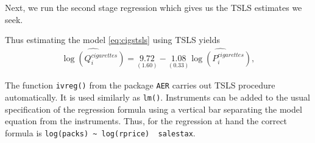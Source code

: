 \documentclass[
  14pt,
]{memoir}
\newenvironment{Shaded}{\begin{snugshade}}{\end{snugshade}}
\newcommand{\AttributeTok}[1]{\textcolor[rgb]{0.77,0.63,0.00}{#1}}
\newcommand{\CommentTok}[1]{\textcolor[rgb]{0.56,0.35,0.01}{\textit{#1}}}
\newcommand{\FunctionTok}[1]{\textcolor[rgb]{0.00,0.00,0.00}{#1}}
\newcommand{\NormalTok}[1]{#1}
\newcommand{\OtherTok}[1]{\textcolor[rgb]{0.56,0.35,0.01}{#1}}
\newcommand{\SpecialCharTok}[1]{\textcolor[rgb]{0.00,0.00,0.00}{#1}}
\newcommand{\StringTok}[1]{\textcolor[rgb]{0.31,0.60,0.02}{#1}}
\begin{document}
\begin{Shaded}
\end{Shaded}

Next, we run the second stage regression which gives us the TSLS estimates we seek.

\begin{Shaded}
\end{Shaded}

Thus estimating the model \eqref{eq:cigstsls} using TSLS yields
\begin{align}
  \widehat{\log(Q_i^{cigarettes})} = \underset{(1.60)}{9.72} - \underset{(0.33)}{1.08} \widehat{\log(P_i^{cigarettes})}, \label{eq:ecigstsls}
\end{align}

The function \texttt{ivreg()} from the package \texttt{AER} carries out TSLS procedure automatically. It is used similarly as \texttt{lm()}. Instruments can be added to the usual specification of the regression formula using a vertical bar separating the model equation from the instruments. Thus, for the regression at hand the correct formula is \texttt{log(packs)\ \textasciitilde{}\ log(rprice)\ \textbar{}\ salestax}.
\end{document}
